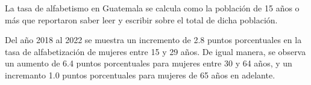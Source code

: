 La tasa de alfabetismo en Guatemala se calcula como la población de 15 años o más que reportaron saber leer y escribir sobre el total de dicha población.

Del año 2018 al 2022 se muestra un incremento de 2.8 puntos porcentuales en la tasa de alfabetización de mujeres entre 15 y 29 años. De igual manera, se observa un aumento de 6.4 puntos porcentuales para mujeres entre 30 y 64 años, y un incremanto 1.0 puntos porcentuales para mujeres de 65 años en adelante. 